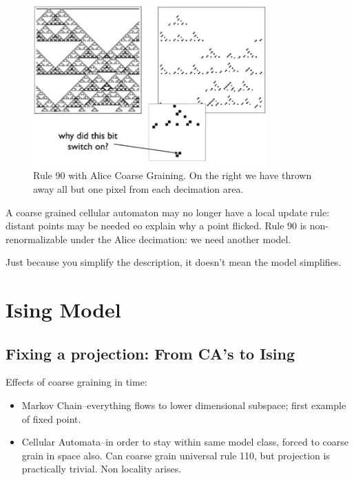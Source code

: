 \documentclass[]{article}
\begin{document}
\begin{figure}[H]
	\begin{center}
		\caption[Rule 90 with Alice Coarse Graining]{Rule 90 with Alice Coarse Graining. On the right we have thrown away all but one pixel from each decimation area.}\label{fig:rule90-alice}
		\includegraphics[width=0.8\textwidth]{rule90-alice}
	\end{center}
\end{figure}

A coarse grained cellular automaton may no longer have a local update rule: distant points may be needed eo explain why a point flicked. Rule 90 is non-renormalizable under the Alice decimation: we need another model.

Just because you simplify the description, it doesn't mean the model simplifies.

\cite{dedeo2018origin}
\section{Ising Model}

\subsection{Fixing a projection: From CA’s to Ising}
Effects of coarse graining in time:
\begin{itemize}
	\item Markov Chain--everything flows to lower dimensional subspace; first example of fixed point.
	\item Cellular Automata--in order to stay within same model class, forced to coarse grain in space also. Can coarse grain universal rule 110, but projection is practically trivial. Non locality arises. 
\end{itemize}
\end{document}
